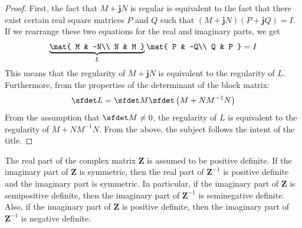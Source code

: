 \documentclass[graybox, envcountchap]{svmult}
\begin{document}
\begin{proof}
First, the fact that $M+ \bm{j} N$ is regular is equivalent to the fact that there exist certain real square matrices $P$ and $Q$ such that $(M+ \bm{j} N)(P+ \bm{j} Q)=I$.
If we rearrange these two equations for the real and imaginary parts, we get
\begin{equation}\label{eq:MNinv}
\underbrace{
\mat{
M & -N\\
N & M
}
}_{L}
\mat{
P & -Q\\
Q & P
}
=I
\end{equation}
This means that the regularity of $M+ \bm{j} N$ is equivalent to the regularity of $L$.
Furthermore, from the properties of the determinant of the block matrix:
\begin{equation*}
\sfdet L =\sfdet M \sfdet \left(M+NM^{-1}N\right)
\end{equation*}
From the assumption that $\sfdet M \neq 0$, the regularity of $L$ is equivalent to the regularity of $M+NM^{-1}N$.
From the above, the subject follows the intent of the title.
\end{proof}

 \begin{lemma}\label{lem:sdreim}
The real part of the complex matrix $\bm{Z}$ is assumed to be positive definite.
If the imaginary part of $\bm{Z}$ is symmetric, then the real part of $\bm{Z}^{-1}$ is positive definite and the imaginary part is symmetric.
In particular, if the imaginary part of $\bm{Z}$ is semipositive definite, then the imaginary part of $\bm{Z}^{-1}$ is seminegative definite.
Also, if the imaginary part of $\bm{Z}$ is positive definite, then the imaginary part of $\bm{Z}^{-1}$ is negative definite.
 \end{lemma}
\end{document}
